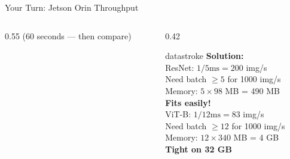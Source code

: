 \documentclass[aspectratio=169, 12pt]{beamer}
\begin{document}
\begin{frame}{Your Turn: Jetson Orin Throughput}
\begin{columns}[T]
\begin{column}{0.55\textwidth}
    {\footnotesize\textcolor{midgray}{(60 seconds --- then compare)}}
  \end{column}
  \begin{column}{0.42\textwidth}
    \pause
    \begin{mlsyscard}{datastroke}
    \textbf{Solution:}\\[0.05cm]
    {\scriptsize
    ResNet: $1/5\text{ms} = 200$ img/s\\
    Need batch $\geq 5$ for 1000 img/s\\
    Memory: $5 \times 98$ MB = 490 MB\\
    \textcolor{datastroke}{\textbf{Fits easily!}}\\[0.1cm]
    ViT-B: $1/12\text{ms} = 83$ img/s\\
    Need batch $\geq 12$ for 1000 img/s\\
    Memory: $12 \times 340$ MB = 4 GB\\
    \textcolor{routingstroke}{\textbf{Tight on 32 GB}}
    }
    \end{mlsyscard}
  \end{column}
\end{columns}

\end{frame}
\end{document}
